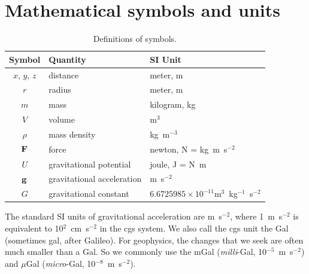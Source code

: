 


\section{Mathematical symbols and units}
\begin{table}[hbt]
    \caption{Definitions of symbols.\vspace{2pt}}
    \label{tab:gravsym}
    \begin{tabular*}{\textwidth}{@{}cll@{}}
        \toprule
        Symbol &
        Quantity &
        SI Unit \\
        \midrule
        $x$, $y$, $z$   & distance                      & meter, m \\
        $r$             & radius                        & meter, m \\
        $m$             & mass                          & kilogram, kg \\
        $V$             & volume                        & m$^{3}$ \\
        $\rho$          & mass density                  & kg~m$^{-3}$ \\
        $\vb{F}$      & force                         & newton, N = kg~m~s$^{-2}$ \\
        $U$             & gravitational potential       & joule, J = N~m \\
        $\vb{g}$      & gravitational acceleration    & m~s$^{-2}$ \\
        $G$             & gravitational constant        & $6.6725985 \times
            10^{-11}$m$^{3}$~kg$^{-1}$~s$^{-2}$ \\
        \bottomrule
    \end{tabular*}
\end{table}

The standard SI units of gravitational acceleration are m~s$^{-2}$, where 1~m~s$^{-2}$ is equivalent to 10$^2$~cm~s$^{-2}$ in the cgs system.  We also call the cgs unit the Gal (sometimes gal, after Galileo).  For geophysics, the changes that we seek are often much smaller than a Gal.  So we commonly use the mGal ({\it milli}-Gal, 10$^{-5}$~m~s$^{-2}$) and $\mu$Gal ({\it micro}-Gal, 10$^{-8}$~m~s$^{-2}$).


